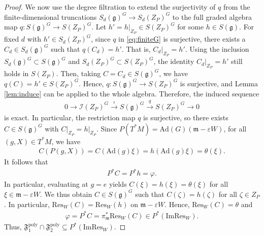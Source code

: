 \documentclass[11pt]{amsart}
\theoremstyle{definition}
\theoremstyle{plain}
\theoremstyle{conclusion}
\begin{document}
\begin{proof}
We now use the degree filtration to extend the surjectivity of $q$ from the finite-dimensional truncations $S_d(\mathfrak{g})^G\to S_d(Z_P)^G$ to the full graded algebra map $q:S(\mathfrak{g})^G\to S(Z_P)^G$. Let $h' = h\vert_{Z_P} \in S(Z_P)^G$ for some $h \in S(\mathfrak{g})$. For fixed $d$ with $h' \in S_d(Z_P)^G$, since $q$ in \eqref{eq:finiteG} is surjective, there exists a $C_d \in S_d(\mathfrak{g})^G$ such that $q(C_d) = h'$. That is, $C_d\vert_{Z_P} = h'$. Using the inclusion $S_d(\mathfrak{g})^G \subset S(\mathfrak{g})^G$ and $S_d(Z_P)^G \subset S(Z_P)^G$, the identity $C_d\vert_{Z_P} = h'$ still holds in $S(Z_P)$. Then, taking $C = C_d \in S(\mathfrak{g})^G$, we have $q(C) = h' \in S(Z_P)^G$. Hence, $q:S(\mathfrak{g})^G\to S(Z_P)^G$ is surjective, and Lemma \ref{lem:induce} can be applied to the whole algebra. Therefore, the induced sequence \begin{align}
0\longrightarrow \mathcal{I}(Z_P)^G\xrightarrow{\,\iota\,} S(\mathfrak{g})^G \xrightarrow{\,q\, }S(Z_P)^G\longrightarrow 0 \label{eq:induceseq}
\end{align} is exact.  In particular, the restriction map $q$ is surjective, so there exists $C \in S(\mathfrak{g})^G$ with $C\vert_{Z_P}=h\vert_{Z_P} $.  Since $P(T^*M)=\mathrm{Ad}(G)(\mathfrak{m}- \varepsilon W)$, for all $(g,X) \in T^*M$, we have \begin{align*}
    C(P(g,X)) = C(\mathrm{Ad}(g)\xi) = h(\mathrm{Ad}(g)\xi) = \theta(\xi).
\end{align*} It follows that \begin{align*}
P^*C = P^*h = \varphi.
\end{align*} In particular, evaluating at $g =e$ yields $C(\xi)= h(\xi) = \theta(\xi)$ for all $\xi\in\mathfrak{m} - \varepsilon W$. We thus obtain $C \in S(\mathfrak{g})^G$ such that $C(\zeta) = h(\zeta)$ for all $\zeta \in Z_P$. In particular, $\mathrm{Res}_W(C) =\mathrm{Res}_W(h) $ on $\mathfrak{m} -\varepsilon W$. Hence, $\mathrm{Res}_W(C) = \theta$ and \begin{align*}
\varphi = P^*C= \pi_{\mathfrak{m}}^*\mathrm{Res}_W(C) \in P^*(\mathrm{Im}\mathrm{Res}_W).
\end{align*} Thus, $\mathfrak{F}_1^{\mathrm{poly}}\cap \mathfrak{F}_2^{\mathrm{poly}}\subseteq P^*(\mathrm{Im}\mathrm{Res}_W)$.


\end{proof}
\end{document}
